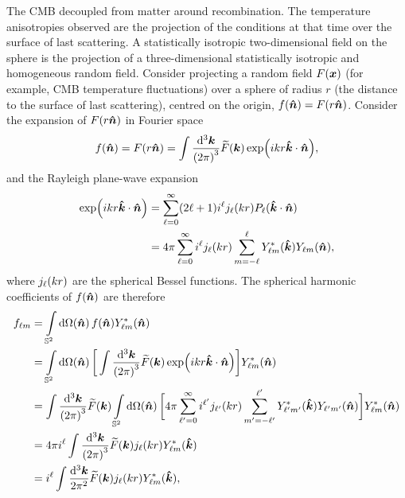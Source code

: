 The CMB decoupled from matter around recombination.
The temperature anisotropies observed are the projection of the conditions at that time over the surface of last scattering.
A statistically isotropic two-dimensional field on the sphere is the projection of a three-dimensional statistically isotropic and homogeneous random field.
Consider projecting a random field \(F(\vb*{x})\) (for example, CMB temperature fluctuations) over a sphere of radius \(r\) (the distance to the surface of last scattering), centred on the origin, \ie{} \(f(\vu*{n}) = F(r\vu*{n})\).
Consider the expansion of \(F(r\vu*{n})\) in Fourier space
%
\begin{equation}
	f(\vu*{n})
	= F(r\vu*{n})
	= \int\frac{\dd[3]{\vb*{k}}}{{(2\pi)}^{3}} \fourier{F}(\vb*{k}) \exp(i k r\vu*{k}\cdot\vu*{n}),
\end{equation}
%
and the Rayleigh plane-wave expansion
%
\begin{align}
	\exp(i k r\vu*{k}\cdot\vu*{n})
	 & = \sum\limits_{\ell=0}^{\infty} (2\ell+1) i^{\ell} \bessel{k r} P_{\ell}(\vu*{k}\cdot\vu*{n}) \nonumber{}                                   \\
	 & = 4\pi \sum\limits_{\ell=0}^{\infty} i^{\ell} \bessel{k r} \sum\limits_{m=-\ell}^{\ell} \conj{\harmonic{Y}}(\vu*{k}) \harmonic{Y}(\vu*{n}),
\end{align}
%
where \(\bessel{k r}\) are the spherical Bessel functions.
The spherical harmonic coefficients of \(f(\vu*{n})\) are therefore
%
\begin{align}
	\harmonic{f}
	 & = \integrateSphere{\vu*{n}} f(\vu*{n}) \conj{\harmonic{Y}}(\vu*{n}) \nonumber{}                                                                                                                                                                                                                       \\
	 & = \integrateSphere{\vu*{n}} \bigg[\int\frac{\dd[3]{\vb*{k}}}{{(2\pi)}^{3}} \fourier{F}(\vb*{k}) \exp(i k r\vu*{k}\cdot\vu*{n})\bigg] \conj{\harmonic{Y}}(\vu*{n}) \nonumber{}                                                                                                                         \\
	 & = \int\frac{\dd[3]{\vb*{k}}}{{(2\pi)}^{3}} \fourier{F}(\vb*{k}) \integrateSphere{\vu*{n}} \bigg[4\pi \sum\limits_{\ell'=0}^{\infty} i^{\ell'} \bessel[']{k r} \sum\limits_{m'=-\ell'}^{\ell'} \conj{\harmonic[']{Y}}(\vu*{k}) \harmonic[']{Y}(\vu*{n})\bigg] \conj{\harmonic{Y}}(\vu*{n}) \nonumber{} \\
	 & = 4\pi i^{\ell} \int\frac{\dd[3]{\vb*{k}}}{{(2\pi)}^{3}} \fourier{F}(\vb*{k}) \bessel{k r} \conj{\harmonic{Y}}(\vu*{k}) \nonumber{}                                                                                                                                                                   \\
	 & = i^{\ell} \int\frac{\dd[3]{\vb*{k}}}{2\pi^{2}} \fourier{F}(\vb*{k}) \bessel{k r} \conj{\harmonic{Y}}(\vu*{k}),
\end{align}
